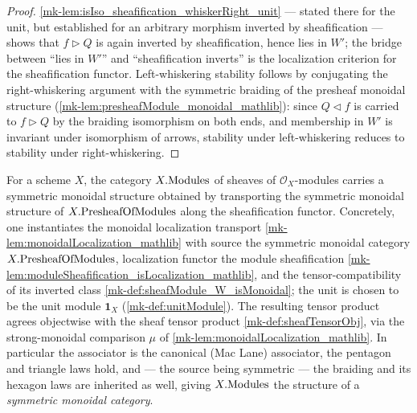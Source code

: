 \begin{proof}
  \leanok
  \ref{mk-lem:isIso_sheafification_whiskerRight_unit} --- stated there for the unit,
  but established for an arbitrary morphism inverted by sheafification --- shows
  that \(f \rhd Q\) is again inverted by sheafification, hence lies in \(W'\); the
  bridge between ``lies in \(W'\)'' and ``sheafification inverts'' is the
  localization criterion for the sheafification functor. Left-whiskering stability
  follows by conjugating the right-whiskering argument with the symmetric braiding of
  the presheaf monoidal structure (\ref{mk-lem:presheafModule_monoidal_mathlib}):
  since \(Q \lhd f\) is carried to \(f \rhd Q\) by the braiding isomorphism on
  both ends, and membership in \(W'\) is invariant under isomorphism of arrows,
  stability under left-whiskering reduces to stability under right-whiskering.
\end{proof}

\begin{definition}\label{mk-def:sheafModule_monoidalStructure}
  \leanok

  For a scheme \(X\), the category \(X.\mathrm{Modules}\) of sheaves of
  \(\mathcal{O}_X\)-modules carries a symmetric monoidal structure obtained by
  transporting the symmetric monoidal structure of \(X.\mathrm{PresheafOfModules}\) along the
  sheafification functor. Concretely, one instantiates the monoidal localization
  transport \ref{mk-lem:monoidalLocalization_mathlib} with source the symmetric
  monoidal category \(X.\mathrm{PresheafOfModules}\), localization functor the module sheafification
  \ref{mk-lem:moduleSheafification_isLocalization_mathlib}, and the
  tensor-compatibility of its inverted class \ref{mk-def:sheafModule_W_isMonoidal};
  the unit is chosen to be the unit module \(\mathbf{1}_X\) (\ref{mk-def:unitModule}).
  The resulting tensor product agrees objectwise with the sheaf tensor product
  \ref{mk-def:sheafTensorObj}, via the strong-monoidal comparison
  \(\mu\) of \ref{mk-lem:monoidalLocalization_mathlib}. In particular the associator
  is the canonical (Mac Lane) associator, the pentagon and triangle laws hold, and
  --- the source being symmetric --- the braiding and its hexagon laws are
  inherited as well, giving \(X.\mathrm{Modules}\) the structure of a
  \emph{symmetric monoidal category}.
\end{definition}

